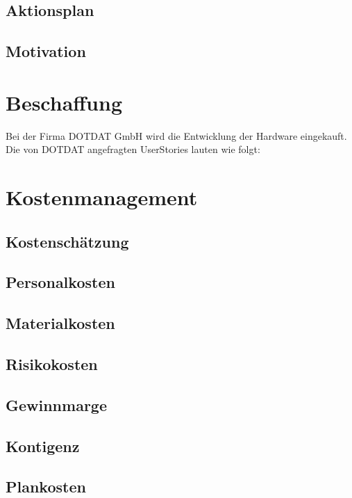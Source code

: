 \subsection{Aktionsplan}



\subsection{Motivation} %



\section{Beschaffung} %
Bei der Firma DOTDAT GmbH wird die Entwicklung der Hardware eingekauft. Die von DOTDAT angefragten UserStories lauten wie folgt:





% 




\section{Kostenmanagement}



\subsection{Kostenschätzung}
\lipsum[2]
\subsection{Personalkosten} %
\lipsum[2]
\subsection{Materialkosten}
\lipsum[2]
\subsection{Risikokosten}
\lipsum[2]
\subsection{Gewinnmarge}
\lipsum[2]
\subsection{Kontigenz} %
\lipsum[2]
\subsection{Plankosten}
\lipsum[2]





